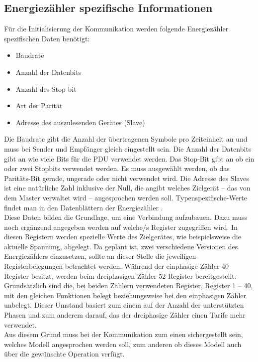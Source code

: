 \documentclass[Bachelorarbeit.tex]{subfiles}
\begin{document}
\newpage
\subsection{ Energiezähler spezifische Informationen}
Für die Initialisierung der Kommunikation werden folgende Energiezähler spezifischen Daten benötigt:
\begin{itemize}
\item Baudrate
\item Anzahl der Datenbits
\item Anzahl des Stop-bit
\item Art der Parität
\item Adresse des auszulesenden Gerätes (Slave)
\end{itemize}
Die Baudrate gibt die Anzahl der übertragenen Symbole pro Zeiteinheit an und muss bei Sender und Empfänger gleich eingestellt sein. 
Die Anzahl der Datenbits gibt an wie viele Bits für die \ac{PDU} verwendet werden. 
Das Stop-Bit gibt an ob ein oder zwei Stopbits verwendet werden. 
Es muss ausgewählt werden, ob das Paritäts-Bit gerade, ungerade oder nicht verwendet wird. 
Die Adresse des Slaves ist eine natürliche Zahl inklusive der Null, die angibt welches Zielgerät – das von dem Master verwaltet wird – angesprochen werden soll. 
Typenspezifische-Werte findet man in den Datenblättern der Energiezähler \parencites[siehe:][]{datenblatt_ald1}[und][]{datenblatt_ale3}.\\
Diese Daten bilden die Grundlage, um eine Verbindung aufzubauen. 
Dazu  muss noch ergänzend angegeben werden auf welche/s Register zugegriffen wird.
In diesen Registern werden spezielle Werte des Zielgerätes, wie beispielsweise die aktuelle Spannung, abgelegt.
Da geplant ist, zwei verschiedene Versionen des Energiezählers einzusetzen, sollte an dieser Stelle die jeweiligen Registerbelegungen betrachtet werden. 
Während der einphasige Zähler 40 Register besitzt, werden beim dreiphasigen Zähler 52 Register bereitgestellt. 
Grundsätzlich sind die, bei beiden Zählern verwendeten Register, Register 1 – 40, mit den gleichen Funktionen belegt beziehungsweise bei den einphasigen Zähler unbelegt. 
Dieser Umstand basiert zum einem auf der Anzahl der unterstützten Phasen und zum anderem darauf, das der dreiphasige Zähler einen Tarife mehr verwendet. \parencites[vgl:][]{datenblatt_ald1}[und][]{datenblatt_ale3} \\
Aus diesem Grund muss bei der Kommunikation zum einen sichergestellt sein, welches Modell angesprochen werden soll, zum anderen ob dieses Modell auch über die gewünschte Operation verfügt.
\end{document}
